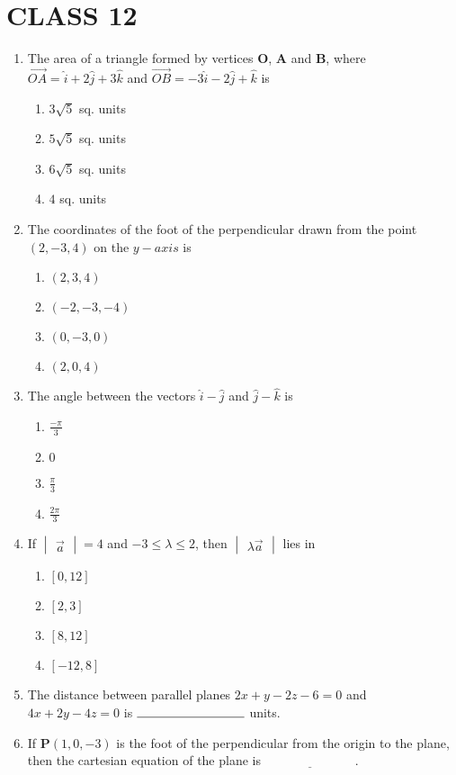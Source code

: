 \documentclass[12pt,-letter paper]{article}
\let\vec\mathbf{}
\let\vec\mathbf{}
\providecommand{\mydet}[1]{\ensuremath{\begin{vmatrix}#1\end{vmatrix}}}
\providecommand{\sbrak}[1]{\ensuremath{{}\left[#1\right]}}
\providecommand{\brak}[1]{\ensuremath{\left(#1\right)}}
\begin{document}
\section{CLASS 12}
\begin{enumerate}
\item The area of a triangle formed by vertices $\vec{O}$, $\vec{A}$ and $\vec{B}$, where $\overrightarrow{OA}= \hat{i}+2 \hat{j}+3\hat{k}$ and $\overrightarrow{OB}= -3\hat{i} - 2\hat{j} + \hat{k}$ is
\begin{enumerate}
\item $3\sqrt{5}$ sq. units
\item $5\sqrt{5}$ sq. units
\item $6\sqrt{5}$ sq. units
\item $4$ sq. units
\end{enumerate}
\item The coordinates of the foot of the perpendicular drawn from the point $\brak{2,-3,4}$ on the $y-axis$ is
\begin{enumerate}
\item $\brak{2, 3, 4}$
\item $\brak{-2,-3,-4}$
\item $\brak{0,-3, 0}$
\item $\brak{2, 0,4}$
\end{enumerate}
\item The angle between the vectors $\hat{i} - \hat{j}$ and $\hat{j} - \hat{k}$ is
\begin{enumerate}
\item $\frac{-\pi}{3}$
\item $0$
\item $\frac{\pi}{3}$
\item $\frac{2\pi}{3}$
\end{enumerate}
\item If $\mydet{\overrightarrow{a}}= 4$ and $-3 \leq \lambda \leq 2$, then $\mydet{\lambda \overrightarrow a}$ lies in
\begin{enumerate}
\item $\sbrak{0,12}$
\item $\sbrak{2,3}$
\item $\sbrak{8,12}$
\item $\sbrak{-12,8}$
\end{enumerate}
\item The distance between parallel planes $2x + y - 2z - 6 = 0$ and $4x + 2y - 4z = 0$ is $\rule{3cm}{0.15mm}$ units.
\item If $\vec{P}\brak{1,  0, -3}$ is the foot of the perpendicular from the origin to the plane, then the cartesian equation of the plane is $\underline{\hspace{3cm}}$.

\end{enumerate}
\end{document}

